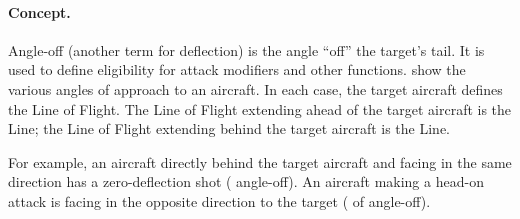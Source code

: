 \paragraph{Concept.} Angle-off (another term for deflection) is the angle “off” the target's tail. It is used to define eligibility for attack modifiers and other functions.  show the various angles of approach to an aircraft.  In each case, the target aircraft defines the Line of Flight. The Line of Flight extending ahead of the target aircraft is the  Line; the Line of Flight extending behind the target aircraft is the  Line.

For example, an aircraft directly behind the target aircraft and facing in the same direction has a zero-deflection shot ( angle-off). An aircraft making a head-on attack is facing in the opposite direction to the target ( of angle-off).

